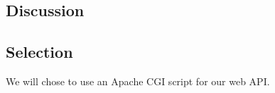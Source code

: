\subsection{Discussion}

\cite{kore-io}
\cite{kore-feature}
\cite{cgi-tutorial}
\cite{flask-site}

\subsection{Selection}

We will chose to use an Apache CGI script for our web API.
